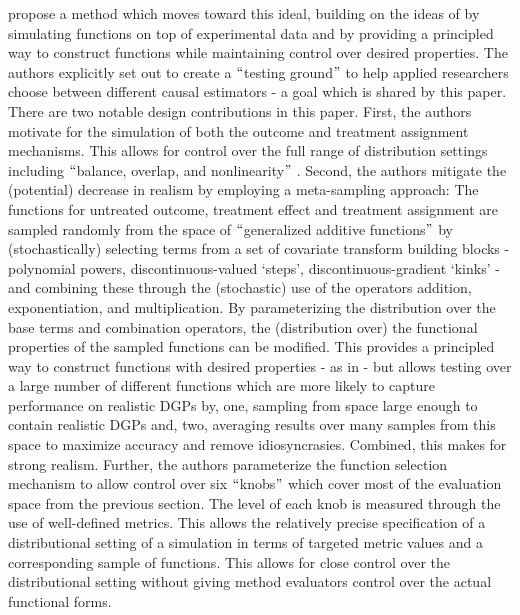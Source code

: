 \documentclass[../main.tex]{subfiles}
\begin{document}
\vspace{\baselineskip}
\textcite{Dorie2019Automated1} propose a method which moves toward this ideal, building on the ideas of \textcite{Hill2011BayesianInference} by simulating functions on top of experimental data and \textcite{Kern2016AssessingPopulations} by providing a principled way to construct functions while maintaining control over desired properties. The authors explicitly set out to create a $``$testing ground$"$  to help applied researchers choose between different causal estimators - a goal which is shared by this paper. There are two notable design contributions in this paper. First, the authors motivate for the simulation of both the outcome and treatment assignment mechanisms. This allows for control over the full range of distribution settings including $``$balance, overlap, and nonlinearity$"$ . Second, the authors mitigate the (potential) decrease in realism by employing a meta-sampling approach: The functions for untreated outcome, treatment effect and treatment assignment are sampled randomly from the space of $``$generalized additive functions$"$  by (stochastically) selecting terms from a set of covariate transform building blocks - polynomial powers, discontinuous-valued ‘steps’, discontinuous-gradient ‘kinks’ - and combining these through the (stochastic) use of the operators addition, exponentiation, and multiplication. By parameterizing the distribution over the base terms and combination operators, the (distribution over) the functional properties of the sampled functions can be modified. This provides a principled way to construct functions with desired properties - as in \textcite{Kern2016AssessingPopulations} - but allows testing over a large number of different functions which are more likely to capture performance on realistic DGPs by, one, sampling from space large enough to contain realistic DGPs and, two, averaging results over many samples from this space to maximize accuracy and remove idiosyncrasies. Combined, this makes for strong realism. Further, the authors parameterize the function selection mechanism to allow control over six $``$knobs$"$  which cover most of the evaluation space from the previous section. The level of each knob is measured through the use of well-defined metrics. This allows the relatively precise specification of a distributional setting of a simulation in terms of targeted metric values and a corresponding sample of functions. This allows for close control over the distributional setting without giving method evaluators control over the actual functional forms. \par
\end{document}
